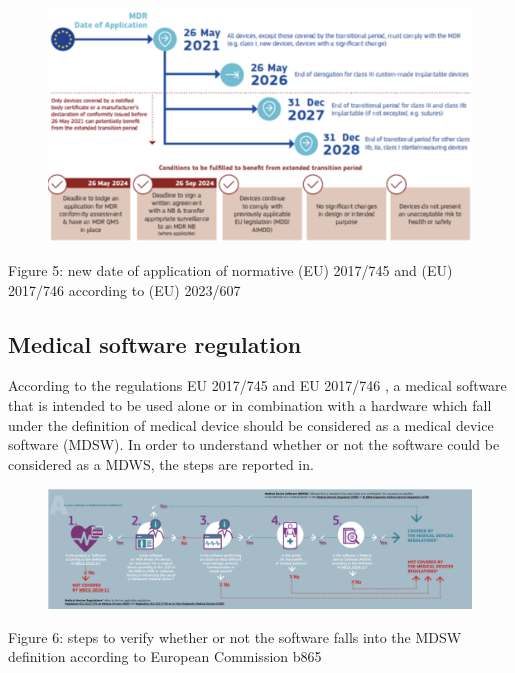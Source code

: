 \documentclass{Configuration_Files/PoliMi3i_thesis}
\begin{document}
\begin{figure}[H]
	\includegraphics[scale=0.3]{Ethics/Screenshot 2024-08-15 at 10.54.56.png}
	\centering
\end{figure}


Figure 5: new date of application of normative (EU) 2017/745 and (EU) 2017/746 according to (EU) 2023/607 \cite{NewRevisedResource}

\subsection{Medical software regulation}

According to the regulations EU 2017/745 \cite{RegolamentoUE20172017} and EU 2017/746 \cite{RegolamentoUE20172017a}, a medical software that is intended to be used alone or in combination with a hardware which fall under the definition of medical device should be considered as a medical device software (MDSW). 
In order to understand whether or not the software could be considered as a MDWS, the steps are reported in.

\begin{figure}[H]

	\includegraphics[scale=0.3]{Ethics/Screenshot 2024-08-15 at 10.55.04.png}
	\centering
\end{figure}

Figure 6: steps to verify whether or not the software falls into the MDSW definition according to European Commission \cite{} b865
\end{document}
